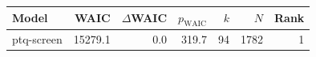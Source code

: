 \begin{tabular}{lrrrrrr}
\toprule
Model & WAIC & $\Delta$WAIC & $p_{\mathrm{WAIC}}$ & $k$ & $N$ & Rank \\
\midrule
ptq-screen & 15279.1 & 0.0 & 319.7 & 94 & 1782 & 1 \\
\bottomrule
\end{tabular}
